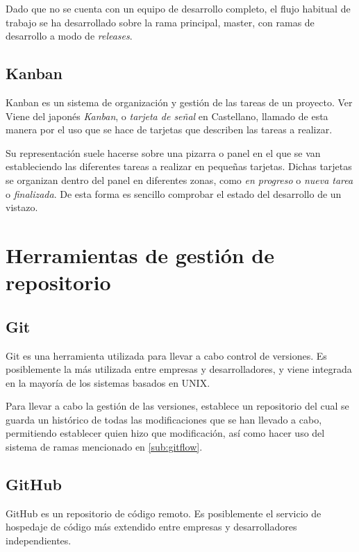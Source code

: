 Dado que no se cuenta con un equipo de desarrollo completo, el flujo habitual de trabajo se ha desarrollado sobre la rama principal, master, con ramas de desarrollo a modo de \textit{releases}. 

\subsection{Kanban}
\label{sub:Kanban}

Kanban es un sistema de organización y gestión de las tareas de un proyecto. Ver \citep{wiki:Kanban}
Viene del japonés \textit{Kanban}, o \textit{tarjeta de señal} en Castellano, llamado de esta manera por el uso que se hace de tarjetas que describen las tareas a realizar. 

Su representación suele hacerse sobre una pizarra o panel en el que se van estableciendo las diferentes tareas a realizar en pequeñas tarjetas. Dichas tarjetas se organizan dentro del panel en diferentes zonas, como \textit{en progreso} o \textit{nueva tarea} o \textit{finalizada}. 
De esta forma es sencillo comprobar el estado del desarrollo de un vistazo. 

\section{Herramientas de gestión de repositorio}

\subsection{Git}

Git es una herramienta utilizada para llevar a cabo control de versiones. Es posiblemente la más utilizada entre empresas y desarrolladores, y viene integrada en la mayoría de los sistemas basados en UNIX.

Para llevar a cabo la gestión de las versiones, establece un repositorio del cual se guarda un histórico de todas las modificaciones que se han llevado a cabo, permitiendo establecer quien hizo que modificación, así como hacer uso del sistema de ramas mencionado en \ref{sub:gitflow}. 

\subsection{GitHub}

GitHub es un repositorio de código remoto. Es posiblemente el servicio de hospedaje de código más extendido entre empresas y desarrolladores independientes. \citep{wiki:GitHub}

